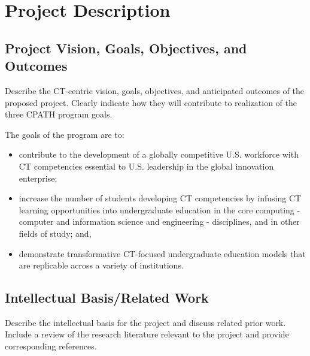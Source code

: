 
\section*{Project Description}
\renewcommand{\thepage} {C--\arabic{page}}

\subsection*{Project Vision, Goals, Objectives, and Outcomes}

Describe the CT-centric vision, goals, objectives, and anticipated outcomes of the proposed project. Clearly indicate how they will contribute to realization of the three CPATH program goals. 

The goals of the program are to:

\begin{itemize}
\item contribute to the development of a globally competitive U.S. workforce with CT competencies essential to U.S. leadership in the global innovation enterprise;

\item increase the number of students developing CT competencies by infusing CT learning opportunities into undergraduate education in the core computing - computer and information science and engineering - disciplines, and in other fields of study; and,

\item demonstrate transformative CT-focused undergraduate education models that are replicable across a variety of institutions.
\end{itemize}


\subsection*{Intellectual Basis/Related Work}

Describe the intellectual basis for the project and discuss related prior work.  Include a review of the research literature relevant to the project and provide corresponding references. 

